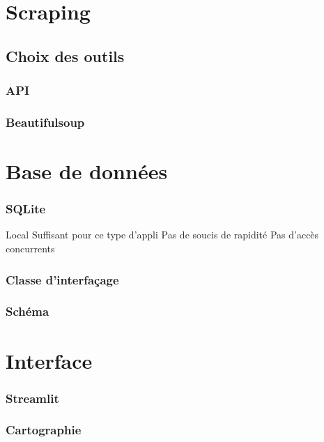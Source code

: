 \documentclass[10pt,french]{report}
\begin{document}
	\chapter{Scraping}
	
	\section{Choix des outils}

	\subsection{API}
	
	\subsection{Beautifulsoup}
	
	\chapter{Base de données}
	
	\subsection{SQLite}
	
	Local
	Suffisant pour ce type d'appli
	Pas de soucis de rapidité
	Pas d'accès concurrents
	
	\subsection{Classe d'interfaçage}
	
	\subsection{Schéma}
	
	\chapter{Interface}

	\subsection{Streamlit}
	
	\subsection{Cartographie}
	
\end{document}

